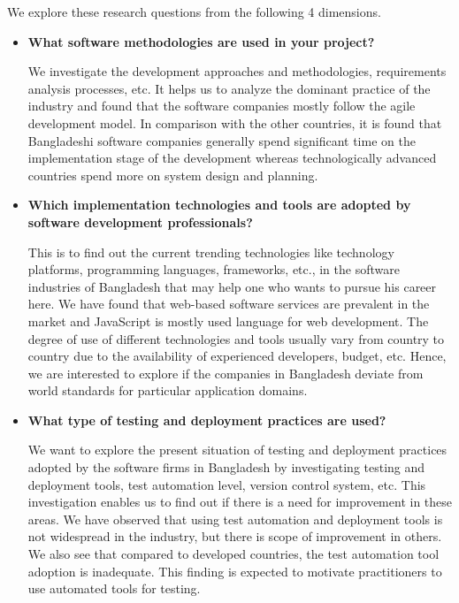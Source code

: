 We explore these research questions from the following 4 dimensions.

\begin{itemize}[leftmargin=10pt]

    \item \textbf{What software methodologies are used in your project?}
    
    We investigate the development approaches and methodologies, requirements analysis processes, etc. It helps us to analyze the dominant practice of the industry and found that the software companies mostly follow the agile development model. In comparison with the other countries, it is found that Bangladeshi software companies generally spend significant time on the implementation stage of the development whereas technologically advanced countries spend more on system design and planning.
        
    \item \textbf{Which implementation technologies and tools are adopted by software development professionals?}
        
    This is to find out the current trending technologies like technology platforms, programming languages, frameworks, etc., in the software industries of Bangladesh that may help one who wants to pursue his career here. We have found that web-based software services are prevalent in the market and JavaScript is mostly used language for web development. The degree of use of different technologies and tools usually vary from country to country due to the availability of experienced developers, budget, etc. Hence, we are interested to explore if the companies in Bangladesh deviate from world standards for particular application domains.

        
    \item \textbf{What type of testing and deployment practices are used?}
        
    We want to explore the present situation of testing and deployment practices adopted by the software firms in Bangladesh by investigating testing and deployment tools, test automation level, version control system, etc. This investigation enables us to find out if there is a need for improvement in these areas. We have observed that using test automation and deployment tools is not widespread in the industry, but there is scope of improvement in others. We also see that compared to developed countries, the test automation tool adoption is inadequate. This finding is expected to motivate practitioners to use automated tools for testing.
        

\end{itemize}
